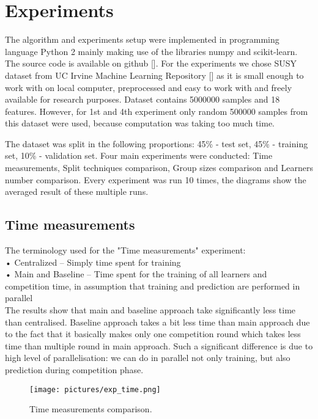 \documentclass{scrartcl}
\begin{document}
\section{Experiments}
The algorithm and experiments setup were implemented in programming language Python 2 mainly making use of  the libraries numpy and scikit-learn. The source code is available on github []. For the experiments we chose SUSY dataset from UC Irvine Machine Learning Repository [] as it is small enough to work with on local computer, preprocessed and easy to work with and freely available for research purposes. Dataset contains 5000000 samples and 18 features. However, for 1st and 4th experiment only random 500000 samples from this dataset were used, because computation was taking too much time. 

The dataset was split in the following proportions: 45\% - test set, 45\% - training set, 10\% - validation set. Four main experiments were conducted: Time measurements, Split techniques comparison, Group sizes comparison and Learners number comparison. Every experiment was run 10 times, the diagrams show the averaged result of these multiple runs. \\
\subsection{Time measurements}
The terminology used for the "Time measurements" experiment: \\
•	Centralized – Simply time spent for training \\
•	Main and Baseline – Time spent for the training of all learners and competition time, in assumption that training and prediction are performed in parallel \\

The results show that main and baseline approach take significantly less time than centralised. Baseline approach takes a bit less time than main approach due to the fact that it basically makes only one competition round which takes less time than multiple round in main approach. Such a significant difference is due to high level of parallelisation: we can do in parallel not only training, but also prediction during competition phase.
\begin{figure}[H]
  \begin{center}
  \texttt{[image: pictures/exp\_time.png]}
    \end{center}
  \caption{Time measurements comparison.}
  \label{fig:exp_time}
\end{figure}
\end{document}
